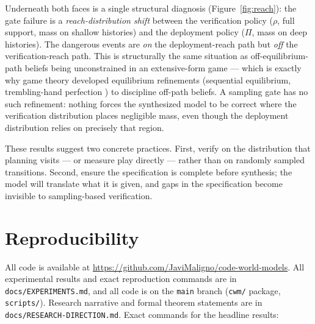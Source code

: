 \documentclass[11pt]{article}
\theoremstyle{remark}
\begin{document}
Underneath both faces is a single structural diagnosis (Figure~\ref{fig:reach}): the gate failure is a \emph{reach-distribution shift} between the verification policy ($\rho$, full support, mass on shallow histories) and the deployment policy ($\Pi$, mass on deep histories). The dangerous events are \emph{on} the deployment-reach path but \emph{off} the verification-reach path. This is structurally the same situation as off-equilibrium-path beliefs being unconstrained in an extensive-form game --- which is exactly why game theory developed equilibrium refinements (sequential equilibrium, trembling-hand perfection \citep{selten1975trembling}) to discipline off-path beliefs. A sampling gate has no such refinement: nothing forces the synthesized model to be correct where the verification distribution places negligible mass, even though the deployment distribution relies on precisely that region.

These results suggest two concrete practices. First, verify on the distribution that planning visits --- or measure play directly --- rather than on randomly sampled transitions. Second, ensure the specification is complete before synthesis; the model will translate what it is given, and gaps in the specification become invisible to sampling-based verification.

\appendix

\section{Reproducibility}

All code is available at \url{https://github.com/JaviMaligno/code-world-models}. All experimental results and exact reproduction commands are in \texttt{docs/EXPERIMENTS.md}, and all code is on the \texttt{main} branch (\texttt{cwm/} package, \texttt{scripts/}). Research narrative and formal theorem statements are in \texttt{docs/RESEARCH-DIRECTION.md}. Exact commands for the headline results:
\end{document}
